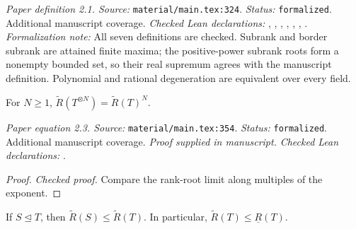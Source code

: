 \noindent\textit{Paper definition 2.1. Source:} \texttt{material/main.tex:324}.
\textit{Status:} \texttt{formalized}. Additional manuscript coverage.
\textit{Checked Lean declarations:} , , , , , , .
\textit{Formalization note:} All seven definitions are checked. Subrank and border subrank are attained finite maxima; the positive-power subrank roots form a nonempty bounded set, so their real supremum agrees with the manuscript definition. Polynomial and rational degeneration are equivalent over every field.

\renewcommand{\thetheorem}{2.3}
\begin{equationresult}
\label{eq:monomial}
\manuscriptproof
{}
\leanok
For $N\ge1$, $\widetilde R(T^{\otimes N})=\widetilde R(T)^N$.
\end{equationresult}

\noindent\textit{Paper equation 2.3. Source:} \texttt{material/main.tex:354}.
\textit{Status:} \texttt{formalized}. Additional manuscript coverage.
\textit{Proof supplied in manuscript.}
\textit{Checked Lean declarations:} .

\begin{proof}
\leanok
{}
\textit{Checked proof.} Compare the rank-root limit along multiples of the exponent.
\end{proof}

\renewcommand{\thetheorem}{2.2}
\begin{lemma}
\label{lem:asymp-border-ineq}
\manuscriptproof
{}
\leanok
If $S\trianglelefteq T$, then $\widetilde R(S)\le\widetilde R(T)$. In particular, $\widetilde R(T)\le\underline R(T)$.
\end{lemma}

